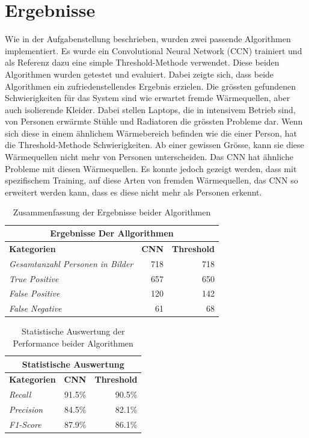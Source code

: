 \documentclass[
	a4paper
]{scrartcl}
\begin{document}
\section{Ergebnisse}
Wie in der Aufgabenstellung beschrieben, wurden zwei passende Algorithmen implementiert. Es wurde ein Convolutional Neural Network (CCN) trainiert und als Referenz dazu eine simple Threshold-Methode verwendet. Diese beiden Algorithmen wurden getestet und evaluiert. Dabei zeigte sich, dass beide Algorithmen ein zufriedenstellendes Ergebnis erzielen. Die grössten gefundenen Schwierigkeiten für das System sind wie erwartet fremde Wärmequellen, aber auch isolierende Kleider. Dabei stellen Laptops, die in intensivem Betrieb sind, von Personen erwärmte Stühle und Radiatoren die grössten Probleme dar. Wenn sich diese in einem ähnlichem Wärmebereich befinden wie die einer Person, hat die Threshold-Methode Schwierigkeiten. Ab einer gewissen Grösse, kann sie diese Wärmequellen nicht mehr von Personen unterscheiden. Das CNN hat ähnliche Probleme mit diesen Wärmequellen. Es konnte jedoch gezeigt werden, dass mit spezifischem Training, auf diese Arten von fremden Wärmequellen, das CNN so erweitert werden kann, dass es diese nicht mehr als Personen erkennt. 
{
	\renewcommand{\arraystretch}{1.3}
	
	\begin{table}[H]
		\scriptsize
		\centering
		\begin{tabularx}{.5\textwidth}{Xrr}\\
			\hline
			\multicolumn{3}{c}{\textbf{Ergebnisse Der Allgorithmen}}\\
			\hline
			\textbf{Kategorien} & \textbf{CNN} & \textbf{Threshold}\\
			\hline 
			\textit{Gesamtanzahl Personen in Bilder} & 718 & 718\\
			\hline
			\textit{True Positive} & 657 & 650\\
			\hline
			\textit{False Positive} & 120 & 142\\
			\hline
			\textit{False Negative} & 61 & 68\\
		\end{tabularx}
		\caption{Zusammenfassung der Ergebnisse beider Algorithmen}
		\label{tab:results}
	\end{table}
	\begin{table}[H]
		\scriptsize
		\centering
		\begin{tabularx}{.5\textwidth}{Xrr}
			\hline
			\multicolumn{3}{c}{\textbf{Statistische Auswertung}}\\
			\hline
			\textbf{Kategorien} & \textbf{CNN} & \textbf{Threshold}\\
			\hline
			\textit{Recall} & 91.5\% & 90.5\%\\
			\hline  
			\textit{Precision} & 84.5\% & 82.1\%\\
			\hline
			\textit{F1-Score} & 87.9\% & 86.1\%\\
			\hline
		\end{tabularx}
		\caption{Statistische Auswertung der Performance beider Algorithmen}
		\label{tbl:heatSources}
	\end{table}
}
\end{document}

